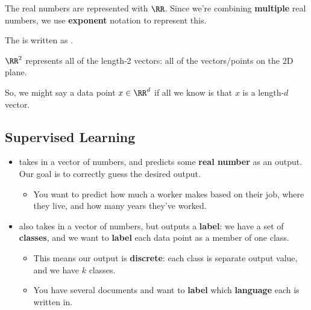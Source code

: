             The real numbers are represented with $\RR$. Since we're combining \textbf{multiple} real numbers, we use \textbf{exponent} notation to represent this.\\
            
            \begin{notation}
                The  is written as .
            \end{notation}
            
            \miniex $\RR^2$ represents all of the length-2 vectors: all of the vectors/points on the 2D plane.
            
            So, we might say a data point $x \in \RR^d$ if all we know is that $x$ is a length-$d$ vector.
    
    \subsection{Supervised Learning}
    
        \begin{itemize}
            \item {} takes in a vector of numbers, and predicts some \textbf{real number} as an output. Our goal is to correctly guess the desired output.
                \begin{itemize}
                    \item \miniex You want to predict how much a worker makes based on their job, where they live, and how many years they've worked. 
                \end{itemize}
            
            \item {} also takes in a vector of numbers, but outputs a \textbf{label}: we have a set of \textbf{classes}, and we want to \textbf{label} each data point as a member of one class. 
                \begin{itemize}
                    \item This means our output is \textbf{discrete}: each class is separate output value, and we have $k$ classes.
                    \item \miniex You have several documents and want to \textbf{label} which \textbf{language} each is written in.
                \end{itemize}
        \end{itemize}
        
